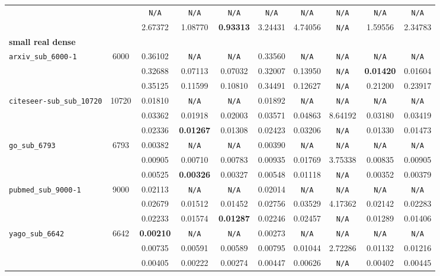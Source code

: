 {\begin{tabular}{ l | c c c c c c c c c }
\verb| | &  & \verb|N/A| & \verb|N/A| & \verb|N/A| & \verb|N/A| & \verb|N/A| & \verb|N/A| & \verb|N/A| & \verb|N/A| \\
\verb| | &  & 2.67372 & 1.08770 & \textbf{0.93313} & 3.24431 & 4.74056 & \verb|N/A| & 1.59556 & 2.34783 \\
\hline
\multicolumn{10}{l}{\textbf{small real dense}} \\
\hline
\verb|arxiv_sub_6000-1| & 6000 & 0.36102 & \verb|N/A| & \verb|N/A| & 0.33560 & \verb|N/A| & \verb|N/A| & \verb|N/A| & \verb|N/A| \\
\verb| | &  & 0.32688 & 0.07113 & 0.07032 & 0.32007 & 0.13950 & \verb|N/A| & \textbf{0.01420} & 0.01604 \\
\verb| | &  & 0.35125 & 0.11599 & 0.10810 & 0.34491 & 0.12627 & \verb|N/A| & 0.21200 & 0.23917 \\
\hline
\verb|citeseer-sub_sub_10720| & 10720 & 0.01810 & \verb|N/A| & \verb|N/A| & 0.01892 & \verb|N/A| & \verb|N/A| & \verb|N/A| & \verb|N/A| \\
\verb| | &  & 0.03362 & 0.01918 & 0.02003 & 0.03571 & 0.04863 & 8.64192 & 0.03180 & 0.03419 \\
\verb| | &  & 0.02336 & \textbf{0.01267} & 0.01308 & 0.02423 & 0.03206 & \verb|N/A| & 0.01330 & 0.01473 \\
\hline
\verb|go_sub_6793| & 6793 & 0.00382 & \verb|N/A| & \verb|N/A| & 0.00390 & \verb|N/A| & \verb|N/A| & \verb|N/A| & \verb|N/A| \\
\verb| | &  & 0.00905 & 0.00710 & 0.00783 & 0.00935 & 0.01769 & 3.75338 & 0.00835 & 0.00905 \\
\verb| | &  & 0.00525 & \textbf{0.00326} & 0.00327 & 0.00548 & 0.01118 & \verb|N/A| & 0.00352 & 0.00379 \\
\hline
\verb|pubmed_sub_9000-1| & 9000 & 0.02113 & \verb|N/A| & \verb|N/A| & 0.02014 & \verb|N/A| & \verb|N/A| & \verb|N/A| & \verb|N/A| \\
\verb| | &  & 0.02679 & 0.01512 & 0.01452 & 0.02756 & 0.03529 & 4.17362 & 0.02142 & 0.02283 \\
\verb| | &  & 0.02233 & 0.01574 & \textbf{0.01287} & 0.02246 & 0.02457 & \verb|N/A| & 0.01289 & 0.01406 \\
\hline
\verb|yago_sub_6642| & 6642 & \textbf{0.00210} & \verb|N/A| & \verb|N/A| & 0.00273 & \verb|N/A| & \verb|N/A| & \verb|N/A| & \verb|N/A| \\
\verb| | &  & 0.00735 & 0.00591 & 0.00589 & 0.00795 & 0.01044 & 2.72286 & 0.01132 & 0.01216 \\
\verb| | &  & 0.00405 & 0.00222 & 0.00274 & 0.00447 & 0.00626 & \verb|N/A| & 0.00402 & 0.00445 \\
\hline
  \end{tabular}
}

